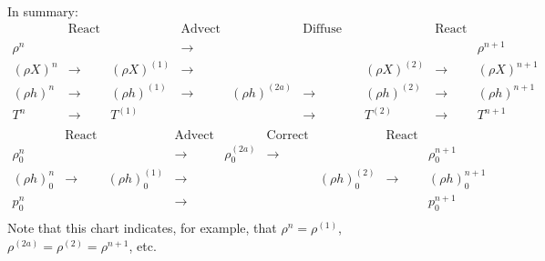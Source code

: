 In summary:
\begin{equation}
\left.\begin{array}{ccccccccc}
& \text{React State} & & \text{Advect State} & & \text{Diffuse Enthalpy} & & \text{React State} & \\
\rho^n & & & \longrightarrow & & & & & \rho^{n+1} \\
(\rho X)^n & \longrightarrow & (\rho X)^{(1)} & \longrightarrow & & & (\rho X)^{(2)} & \longrightarrow & (\rho X)^{n+1} \\
(\rho h)^n & \longrightarrow & (\rho h)^{(1)} & \longrightarrow & (\rho h)^{(2a)} & \longrightarrow & (\rho h)^{(2)} & \longrightarrow & (\rho h)^{n+1}\\
T^n & \longrightarrow & T^{(1)} & & & \longrightarrow & T^{(2)} & \longrightarrow & T^{n+1} \\
\end{array}\right.\nonumber
\end{equation}
\begin{equation}
\left.\begin{array}{ccccccccc}
& \text{React Base} & & \text{Advect Base} & & \text{Correct Base} & & \text{React Base} & \\
\rho_0^n & & & \longrightarrow & \rho_0^{(2a)} & \longrightarrow & & & \rho_0^{n+1} \\
(\rho h)_0^n & \longrightarrow & (\rho h)_0^{(1)} & \longrightarrow & & & (\rho h)_0^{(2)} & \longrightarrow & (\rho h)_0^{n+1} \\
p_0^n & & & \longrightarrow & & & & & p_0^{n+1} \\
\end{array}\right.
\end{equation}
Note that this chart indicates, for example, that $\rho^n = \rho^{(1)}$, $\rho^{(2a)} = \rho^{(2)} = \rho^{n+1}$, etc.
